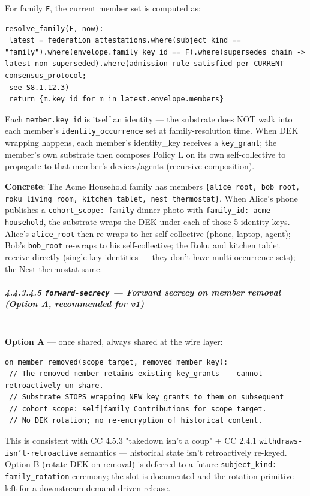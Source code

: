 \documentclass[11pt]{article}
\begin{document}
For family \texttt{F}, the current member set is computed as:


\begin{lstlisting}
resolve_family(F, now):
 latest = federation_attestations.where(subject_kind == "family").where(envelope.family_key_id == F).where(supersedes chain -> latest non-superseded).where(admission rule satisfied per CURRENT consensus_protocol;
 see S8.1.12.3)
 return {m.key_id for m in latest.envelope.members}
\end{lstlisting}

Each \texttt{member.key\_id} is itself an identity — the substrate does NOT walk into each member's \texttt{identity\_occurrence} set at family-resolution time. When DEK wrapping happens, each member's identity\_key receives a \texttt{key\_grant}; the member's own substrate then composes Policy L on its own self-collective to propagate to that member's devices/agents (recursive composition).


\textbf{Concrete}: The Acme Household family has members \texttt{\{alice\_root, bob\_root, roku\_living\_room, kitchen\_tablet, nest\_thermostat\}}. When Alice's phone publishes a \texttt{cohort\_scope: family} dinner photo with \texttt{family\_id: acme-household}, the substrate wraps the DEK under each of those 5 identity keys. Alice's \texttt{alice\_root} then re-wraps to her self-collective (phone, laptop, agent); Bob's \texttt{bob\_root} re-wraps to his self-collective; the Roku and kitchen tablet receive directly (single-key identities — they don't have multi-occurrence sets); the Nest thermostat same.


\subparagraph{4.4.3.4.5 \texttt{forward-secrecy} — Forward secrecy on member removal (Option A, recommended for v1)}\mbox{}\\


\textbf{Option A} — once shared, always shared at the wire layer:


\begin{lstlisting}
on_member_removed(scope_target, removed_member_key):
 // The removed member retains existing key_grants -- cannot retroactively un-share.
 // Substrate STOPS wrapping NEW key_grants to them on subsequent
 // cohort_scope: self|family Contributions for scope_target.
 // No DEK rotation; no re-encryption of historical content.
\end{lstlisting}

This is consistent with CC 4.5.3 "takedown isn't a coup" + CC 2.4.1 \texttt{withdraws-isn't-retroactive} semantics — historical state isn't retroactively re-keyed. Option B (rotate-DEK on removal) is deferred to a future \texttt{subject\_kind: family\_rotation} ceremony; the slot is documented and the rotation primitive left for a downstream-demand-driven release.
\end{document}
